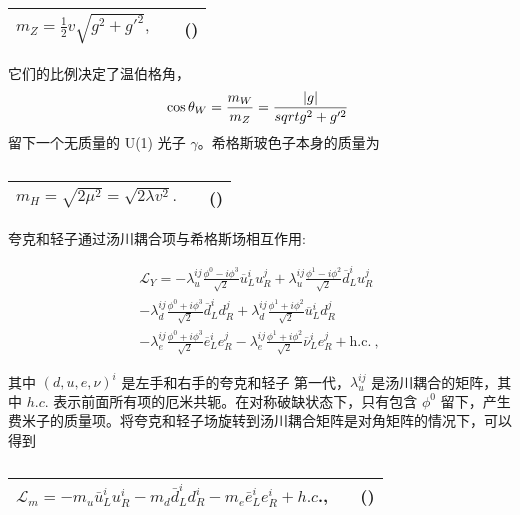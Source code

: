 \begin{table}[h]
\centering
\caption\label{tab_Higgs_5}
\begin{tabular}{|c|c|c|}
\hline
$m_Z = \frac{1}{2} v \sqrt{g^2 + g'^2},$ & & () \\
\hline
\end{tabular}
\end{table}

它们的比例决定了温伯格角，
\begin{equation}
\cos \theta_W = \frac{m_W}{m_Z} = \frac{\left| g \right|}{\\sqrt{g^2 + g'^2}}~
\end{equation}
留下一个无质量的 U(1) 光子 $\gamma$。希格斯玻色子本身的质量为

\begin{table}[h]
\centering
\caption\label{tab_Higgs_6}
\begin{tabular}{|c|c|c|}
\hline
$m_H = \sqrt{2\mu^2} = \sqrt{2\lambda v^2}.$ & & () \\
\hline
\end{tabular}
\end{table}

夸克和轻子通过汤川耦合项与希格斯场相互作用:

\begin{align}
\mathcal{L}_Y = - \lambda_u^{ij} \frac{\phi^0 - i \phi^3}{\sqrt{2}} \overline{u}_L^i u_R^j + \lambda_u^{ij} \frac{\phi^1 - i \phi^2}{\sqrt{2}} \overline{d}_L^i u_R^j\\
- \lambda_d^{ij} \frac{\phi^0 + i \phi^3}{\sqrt{2}} \overline{d}_L^i d_R^j + \lambda_d^{ij} \frac{\phi^1 + i \phi^2}{\sqrt{2}} \overline{u}_L^i d_R^j\\
- \lambda_e^{ij} \frac{\phi^0 + i \phi^3}{\sqrt{2}} \overline{e}_L^i e_R^j - \lambda_e^{ij} \frac{\phi^1 + i \phi^2}{\sqrt{2}} \overline{\nu}_L^i e_R^j + \text{h.c.}~,
\end{align}

其中 $(d, u, e, \nu)^i$ 是左手和右手的夸克和轻子 第一代，$\lambda_u^{ij}$ 是汤川耦合的矩阵，其中 $h.c.$ 表示前面所有项的厄米共轭。在对称破缺状态下，只有包含 $\phi^0$ 留下，产生费米子的质量项。将夸克和轻子场旋转到汤川耦合矩阵是对角矩阵的情况下，可以得到

\begin{table}[h]
\centering
\caption\label{tab_Higgs_7}
\begin{tabular}{|c|c|c|}
\hline
$\mathcal{L}_m = -m_u \bar{u}_L^i u_R^i - m_d \bar{d}_L^i d_R^i - m_e \bar{e}_L^i e_R^i + h.c$., & & () \\
\hline
\end{tabular}
\end{table}

